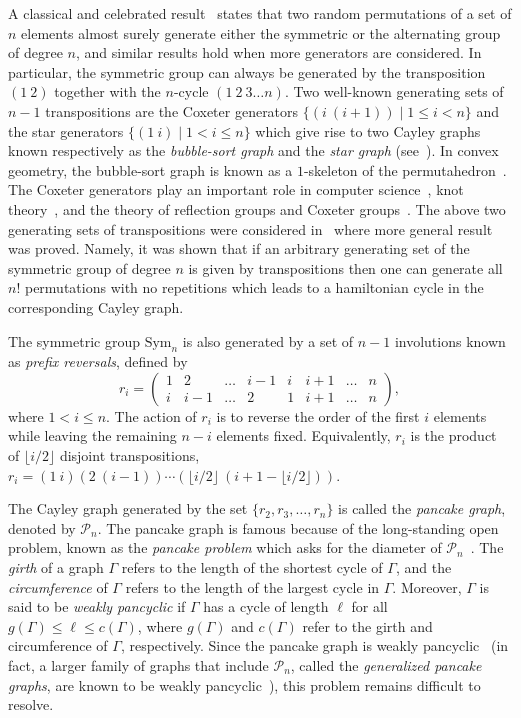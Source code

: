 \documentclass[
final
]{dmtcs-episciences}
\begin{document}
A classical and celebrated result~\cite{D05} states that two random permutations of a set of $n$ elements almost surely generate either the symmetric or the alternating group of degree $n$, and similar results hold when more generators are considered. In particular, the symmetric group can always be generated by the transposition $(1\ 2)$ together with the $n$-cycle $(1\ 2\ 3 \ldots n)$. Two well-known generating sets of $n-1$ transpositions are the Coxeter generators $\{(i\ (i+1)) \mid 1 \leqslant i < n\}$ and the star generators $\{(1\ i) \mid 1<i\leqslant n\}$ which give rise to two Cayley graphs known respectively as the \emph{bubble-sort graph} and the \emph{star graph} (see~\cite{J63,F00,AK89,K08}). In convex geometry, the bubble-sort graph is known as a $1$-skeleton of the permutahedron~\cite{T06}. The Coxeter generators play an important role in computer science~\cite{J63,K}, knot theory~\cite{BB05}, and the theory of reflection groups and Coxeter groups~\cite{H92}. The above two generating sets of transpositions were considered in~\cite{KL75,S78} where more general result was proved. Namely, it was shown that if an arbitrary  generating set of the symmetric group of degree $n$ is given by transpositions then one can generate all $n!$ permutations with no repetitions which leads to a hamiltonian cycle in the corresponding Cayley graph.

The symmetric group $\mathrm{Sym}_n$ is also generated by a set of $n-1$ involutions known as \emph{prefix reversals}, defined by
\begin{equation} \label{e1}
r_i=\begin{pmatrix} 
1 & 2 & \ldots & i-1 & i & i+1 & \ldots & n \\ 
i & i-1 & \ldots & 2 & 1 & i+1 & \ldots & n
\end{pmatrix},
\end{equation}
where $1<i\leqslant n$. The action of $r_i$ is to reverse the order of the first $i$ elements while leaving the remaining $n-i$ elements fixed. Equivalently, $r_i$ is the product of $\lfloor i/2 \rfloor$ disjoint transpositions, $r_i=(1\ i)(2\ (i-1))\cdots(\lfloor i/2\rfloor\ (i+1-\lfloor i/2\rfloor))$.

The Cayley graph generated by the set $\{r_2,r_3,\ldots,r_n\}$ is called the \emph{pancake graph}, denoted by $\mathcal{P}_n$. The pancake graph is famous because of the long-standing open problem, known as the \emph{pancake problem} which asks for the diameter of $\mathcal{P}_n$~\cite{DW75}. The \emph{girth} of a graph $\Gamma$ refers to the length of the shortest cycle of $\Gamma$, and the \emph{circumference} of $\Gamma$ refers to the length of the largest cycle in $\Gamma$. Moreover, $\Gamma$ is said to be \emph{weakly pancyclic} if $\Gamma$ has a cycle of length $\ell$ for all $g(\Gamma)\leqslant\ell\leqslant c(\Gamma)$, where $g(\Gamma)$ and $c(\Gamma)$ refer to the girth and circumference of $\Gamma$, respectively. Since the pancake graph is weakly pancyclic~\cite{KF95,STC06} (in fact, a larger family of graphs that include $\mathcal{P}_n$, called the \emph{generalized pancake graphs}, are known to be weakly pancyclic~\cite{BBP19, BB23}), this problem remains difficult to resolve. 
\end{document}
